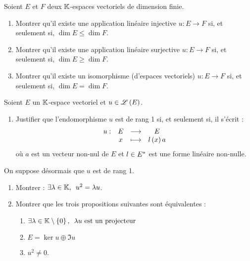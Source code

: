 \begin{exo}[Exercice 5]
Soient \(E\) et \(F\) deux \(\mathbb{K}\)-espaces vectoriels de dimension finie.

\begin{enumerate}
\item Montrer qu'il existe une application linéaire injective \(u:E\to F\) si, et seulement si, \(\dim E\leq\dim F\). \\

\item Montrer qu'il existe une application linéaire surjective \(u:E\to F\) si, et seulement si, \(\dim E\geq\dim F\). \\

\item Montrer qu'il existe un isomorphisme (d'espaces vectoriels) \(u:E\to F\) si, et seulement si, \(\dim E=\dim F\).
\end{enumerate}
\end{exo}

\begin{corr}
\end{corr}

\begin{exo}
Soient \(E\) un \(\mathbb{K}\)-espace vectoriel et \(u\in\mathscr{L}\left(E\right)\).

\begin{enumerate}[series=endoRG1]
\item Justifier que l'endomorphisme \(u\) est de rang 1 si, et seulement si, il s'écrit : \[\begin{array}[t]{cccc}u : & E & \longrightarrow & E \\ & x & \longmapsto & l\left(x\right)a\end{array}\] où \(a\) est un vecteur non-nul de \(E\) et \(l\in E^{*}\) est une forme linéaire non-nulle. \\
\end{enumerate}

On suppose désormais que \(u\) est de rang 1.

\begin{enumerate}[resume=endoRG1]
\item Montrer : \(\quantifs{\exists\lambda\in\K}u^2=\lambda u\). \\

\item Montrer que les trois propositions suivantes sont équivalentes :

\begin{enumerate}
\item \(\quantifs{\exists\lambda\in\K\excluant\accol{0}}\lambda u\text{ est un projecteur}\) \\

\item \(E=\ker u\oplus\Im u\) \\

\item \(u^2\not=0\).
\end{enumerate}
\end{enumerate}
\end{exo}

